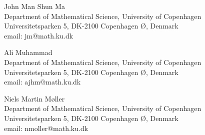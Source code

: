 \documentclass[12pt]{amsart}
\numberwithin{equation}{section}
\theoremstyle{remark}
\begin{document}
	\newpage
	
	\noindent John Man Shun Ma \\
	Department of Mathematical Science, University of Copenhagen \\
	Universitetsparken 5, DK-2100 Copenhagen \O, Denmark\\
	email: jm@math.ku.dk
	
	\bigskip
	
	\noindent Ali Muhammad \\
	Department of Mathematical Science, University of Copenhagen \\
	Universitetsparken 5, DK-2100 Copenhagen \O, Denmark\\
	email: ajhm@math.ku.dk
	
	\bigskip
	
	\noindent Niels Martin M\o ller \\
	Department of Mathematical Science, University of Copenhagen \\
	Universitetsparken 5, DK-2100 Copenhagen \O, Denmark\\
	email: nmoller@math.ku.dk
	
\end{document}
